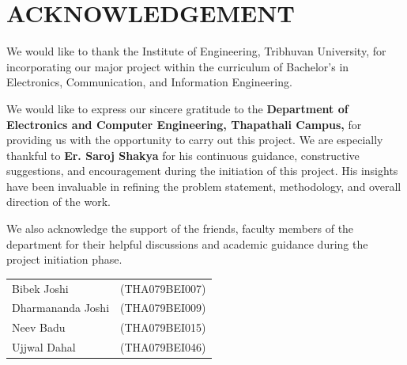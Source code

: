 \newpage
\section*{ACKNOWLEDGEMENT}  
{}

We would like to thank the Institute of Engineering, Tribhuvan University, for incorporating
our major project within the curriculum of Bachelor’s in Electronics, Communication,
and Information Engineering.

We would like to express our sincere gratitude to the \textbf{Department of Electronics
and Computer Engineering, Thapathali Campus,} for providing us with the
opportunity to carry out this project. We are especially thankful to \textbf{Er. Saroj Shakya}
for his continuous guidance, constructive suggestions, and encouragement during
the initiation of this project. His insights have been invaluable in refining
the problem statement, methodology, and overall direction of the work. 

We also acknowledge the support of the friends, faculty members of the department for their helpful
discussions and academic guidance during the project initiation phase.

\vspace{1cm}

\begin{tabular}{@{}l r@{}}
Bibek Joshi & (THA079BEI007) \\
Dharmananda Joshi & (THA079BEI009) \\
Neev Badu & (THA079BEI015) \\
Ujjwal Dahal & (THA079BEI046) \\
\end{tabular}